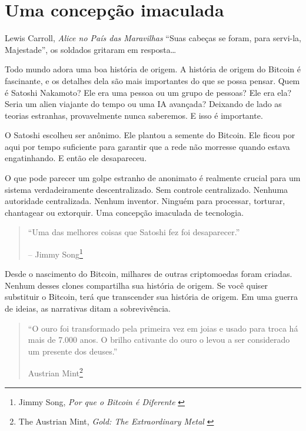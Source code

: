 \chapter{Uma concepção imaculada}
\label{les:5}

\begin{chapquote}{Lewis Carroll, \textit{Alice no País das Maravilhas}}
\enquote{Suas cabeças se foram, para servi-la, Majestade}, os soldados gritaram em resposta\ldots
\end{chapquote}

Todo mundo adora uma boa história de origem. A história de origem do Bitcoin é fascinante, e os detalhes dela são mais importantes do que se possa pensar. Quem é Satoshi Nakamoto? Ele era uma pessoa ou um grupo de pessoas? Ele era ela? Seria um alien viajante do tempo ou uma IA avançada? Deixando de lado as teorias estranhas, provavelmente nunca saberemos. E isso é importante.

O Satoshi escolheu ser anônimo. Ele plantou a semente do Bitcoin. Ele ficou por aqui por tempo suficiente para garantir que a rede não morresse quando estava engatinhando. E então ele desapareceu.

O que pode parecer um golpe estranho de anonimato é realmente crucial para um sistema verdadeiramente descentralizado. Sem controle centralizado. Nenhuma autoridade centralizada. Nenhum inventor. Ninguém para processar, torturar, chantagear ou extorquir. Uma concepção imaculada de tecnologia.

\begin{quotation}\begin{samepage}
\enquote{Uma das melhores coisas que Satoshi fez foi desaparecer.}
\begin{flushright} -- Jimmy Song\footnote{Jimmy Song, \textit{Por que o Bitcoin é Diferente} \cite{bitcoin-different}}
\end{flushright}\end{samepage}\end{quotation}

\newpage

Desde o nascimento do Bitcoin, milhares de outras criptomoedas foram criadas. Nenhum desses clones compartilha sua história de origem. Se você quiser substituir o Bitcoin, terá que transcender sua história de origem. Em uma guerra de ideias, as narrativas ditam a sobrevivência.

\begin{quotation}\begin{samepage}
\enquote{O ouro foi transformado pela primeira vez em joias e usado para troca há mais de 7.000 anos. O brilho cativante do ouro o levou a ser considerado um presente dos deuses.}
\begin{flushright} Austrian Mint\footnote{The Austrian Mint, \textit{Gold: The Extraordinary Metal} \cite{gold-gift-gods}}
\end{flushright}\end{samepage}\end{quotation}

